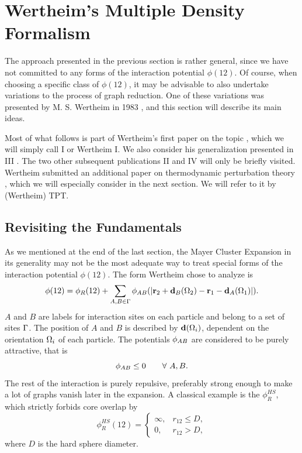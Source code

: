 \documentclass[8.5pt,twoside,twocolumn]{article}
\renewcommand\r{\bo r}
\newcommand\pab{\enmat{\phi_{AB}}}
\theoremstyle{standard}
\begin{document}
\section{Wertheim's Multiple Density Formalism}
\label{WH}
The approach presented in the previous section is rather general, since we have
not committed to any forms of the interaction potential $\phi(12)$. Of course, when
choosing a specific class of $\phi(12)$, it may be advisable to also undertake
variations to the process of graph reduction. One of these variations was
presented by M. S. Wertheim in 1983 \cite{Wertheim1}, and this section will
describe its main ideas.

Most of what follows is part of Wertheim's first paper on the topic
\cite{Wertheim1}, which we will simply call I or Wertheim I. We also consider
his generalization presented in III \cite{Wertheim3}. The two other subsequent
publications II \cite{Wertheim2} and IV \cite{Wertheim4} will only be briefly
visited. Wertheim submitted an additional paper on thermodynamic perturbation
theory \cite{WertheimTPT}, which we will especially consider in the next
section. We will refer to it by (Wertheim) TPT.

\subsection{Revisiting the Fundamentals}
\label{WH:RevFunda}

As we mentioned at the end of the last section, the Mayer Cluster Expansion in
its generality may not be the most adequate way to treat special forms of the
interaction potential $\phi(12)$. The form Wertheim chose to analyze is
\begin{equation}
\phi(12)=\phi_R(12)+\sum_{A,B \in \Ga} \phi_{AB}(\abs{\r_2+\bo
d_B(\Om_2)-\r_1-\bo d_A(\Om_1)}).
\label{WH:phi12}
\end{equation}  
$A$ and $B$ are labels for interaction sites on each particle and belong to a
set of sites $\Gamma$. The position of $A$ and $B$ is described by $\mathbf{d}(\Omega_i)$,
dependent on the orientation $\Omega_i$ of each particle. The potentials $\pab$
are considered to be purely attractive, that is
\begin{equation}
\pab \le 0 \qquad \forall\ A, B.
\label{WH:pabAttractive}
\end{equation} 
The rest of the interaction is purely repulsive, preferably strong enough to
make a lot of graphs vanish later in the expansion. A classical example is the
 $\phi_R^{HS}$, which strictly forbids core overlap by
\begin{equation}
\phi_R^{HS}(12)=\begin{cases}
\infty, &r_{12} \le D, \\
0, &r_{12} > D, 
\end{cases}
\label{WH:HS}
\end{equation}
where $D$ is the hard sphere diameter.
\end{document}
